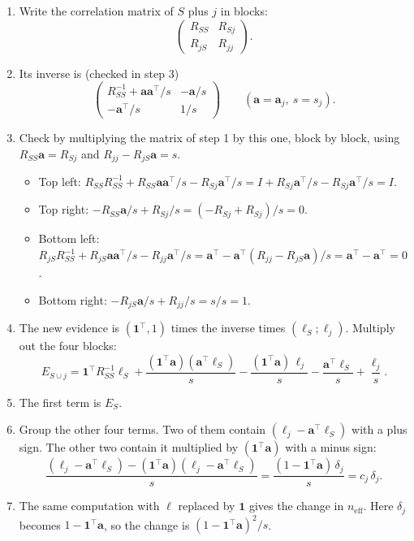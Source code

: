 \documentclass[11pt]{article}
\newcommand{\one}{\mathbf{1}}
\newcommand{\Steps}{\par\smallskip\noindent{\sffamily\bfseries\color{headblue}Steps.}\par}
\newenvironment{steps}{\begin{enumerate}[label=\textbf{\arabic*.},leftmargin=2em,itemsep=6pt]}{\end{enumerate}}
\begin{document}
\Steps
\begin{steps}
  \item Write the correlation matrix of $S$ plus $j$ in blocks:
  \[ \begin{pmatrix}R_{SS}&R_{Sj}\\R_{jS}&R_{jj}\end{pmatrix}. \]
  \item Its inverse is (checked in step 3)
  \[ \begin{pmatrix}R_{SS}^{-1}+\bm a\bm a^\top/s & -\bm a/s\\ -\bm a^\top/s & 1/s\end{pmatrix}\qquad(\bm a=\bm a_j,\ s=s_j). \]
  \item Check by multiplying the matrix of step 1 by this one, block by block, using $R_{SS}\bm a=R_{Sj}$ and $R_{jj}-R_{jS}\bm a=s$.
  \begin{itemize}
    \item Top left: $R_{SS}R_{SS}^{-1}+R_{SS}\bm a\bm a^\top/s-R_{Sj}\bm a^\top/s=I+R_{Sj}\bm a^\top/s-R_{Sj}\bm a^\top/s=I$.
    \item Top right: $-R_{SS}\bm a/s+R_{Sj}/s=(-R_{Sj}+R_{Sj})/s=0$.
    \item Bottom left: $R_{jS}R_{SS}^{-1}+R_{jS}\bm a\bm a^\top/s-R_{jj}\bm a^\top/s=\bm a^\top-\bm a^\top(R_{jj}-R_{jS}\bm a)/s=\bm a^\top-\bm a^\top=0$.
    \item Bottom right: $-R_{jS}\bm a/s+R_{jj}/s=s/s=1$.
  \end{itemize}
  \item The new evidence is $(\one^\top,1)$ times the inverse times $(\bm\ell_S;\ell_j)$. Multiply out the four blocks:
  \[ E_{S\cup j}=\one^\top R_{SS}^{-1}\bm\ell_S+\frac{(\one^\top\bm a)(\bm a^\top\bm\ell_S)}{s}-\frac{(\one^\top\bm a)\,\ell_j}{s}-\frac{\bm a^\top\bm\ell_S}{s}+\frac{\ell_j}{s}. \]
  \item The first term is $E_S$.
  \item Group the other four terms. Two of them contain $(\ell_j-\bm a^\top\bm\ell_S)$ with a plus sign. The other two contain it multiplied by $(\one^\top\bm a)$ with a minus sign:
  \[ \frac{(\ell_j-\bm a^\top\bm\ell_S)-(\one^\top\bm a)(\ell_j-\bm a^\top\bm\ell_S)}{s}=\frac{(1-\one^\top\bm a)\,\delta_j}{s}=c_j\,\delta_j. \]
  \item The same computation with $\bm\ell$ replaced by $\one$ gives the change in $n_{\text{eff}}$. Here $\delta_j$ becomes $1-\one^\top\bm a$, so the change is $(1-\one^\top\bm a)^2/s$.
\end{steps}
\end{document}
